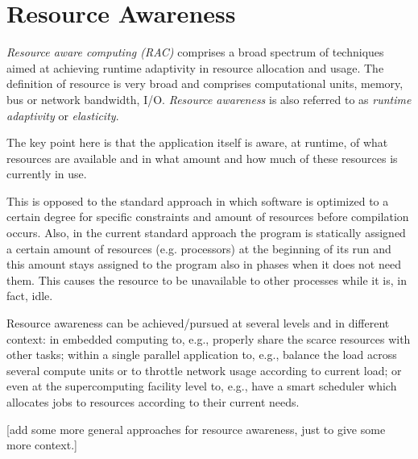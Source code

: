 
\section{Resource Awareness}

\emph{Resource aware computing (RAC)} comprises a broad spectrum of techniques aimed at achieving runtime adaptivity in resource allocation and usage. The definition of resource is very broad and comprises computational units, memory, bus or network bandwidth, I/O.
\emph{Resource awareness} is also referred to as \emph{runtime adaptivity} or \emph{elasticity}.

The key point here is that the application itself is aware, at runtime, of what resources are available and in what amount and how much of these resources is currently in use.

This is opposed to the standard approach in which software is optimized to a certain degree for specific constraints and amount of resources before compilation occurs.
Also, in the current standard approach the program is statically assigned a certain amount of resources (e.g. processors) at the beginning of its run and this amount stays assigned to the program also in phases when it does not need them. This causes the resource to be unavailable to other processes while it is, in fact, idle.

Resource awareness can be achieved/pursued  at several levels and in different context: in embedded computing to, e.g., properly share the scarce resources with other tasks; within a single parallel application to, e.g., balance the load across several compute units or to throttle network usage according to current load; or even at the supercomputing facility level to, e.g., have a smart scheduler which allocates jobs to resources according to their current needs.

[\TODO add some more general approaches for resource awareness, just to give some more context.]


